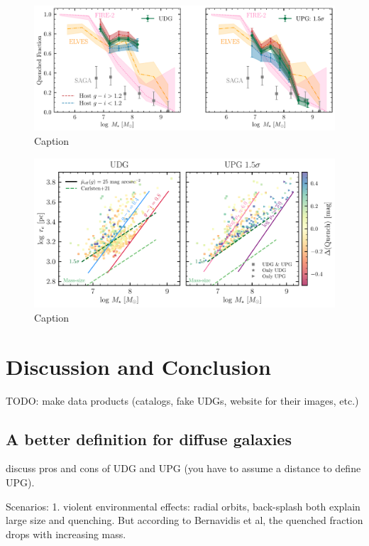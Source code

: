 \documentclass[twocolumn,astrosymb,twocolappendix]{aastex631}
\begin{document}
\begin{CJK*}{UTF8}{gbsn}
\begin{figure}
	\vbox{ 
		\centering
		\includegraphics[width=1\linewidth]{quenched_frac_host_color.pdf}
	}
    \caption{Caption}
    \label{fig:qfrac_host_color}
\end{figure}


\begin{figure}
	\vbox{ 
		\centering
		\includegraphics[width=1\linewidth]{mass_size_plane.pdf}
	}
    \caption{Caption}
    \label{fig:mass_size}
\end{figure}


\section{Discussion and Conclusion}
TODO: make data products (catalogs, fake UDGs, website for their images, etc.)


\subsection{A better definition for diffuse galaxies}

discuss pros and cons of UDG and UPG (you have to assume a distance to define UPG).

Scenarios:
1. violent environmental effects: radial orbits, back-splash both explain large size and quenching. But according to Bernavidis et al, the quenched fraction drops with increasing mass. 


\end{CJK*}
\end{document}
